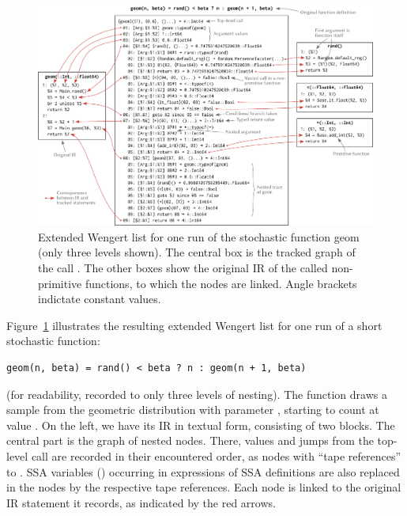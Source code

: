 \begin{figure}[t]
  \centering
  \includegraphics[width=\textwidth]{figures/extended-wengert-list}
  \caption{Extended Wengert list for one run of the stochastic function geom (only three levels
    shown). The central box is the tracked graph of the call \protect{}. The other
    boxes show the original IR of the called non-primitive functions, to which the nodes are
    linked.  Angle brackets indictate constant values.}
  \label{fig:ext-wengert-list}
\end{figure}

Figure~\ref{fig:ext-wengert-list} illustrates the resulting extended Wengert list for one run of a
short stochastic function:
\begin{lstlisting}
geom(n, beta) = rand() < beta ? n : geom(n + 1, beta)
\end{lstlisting}
(for readability, recorded to only three levels of nesting).  The function draws a sample from the
geometric distribution with parameter , starting to count at value . On the
left, we have its IR in textual form, consisting of two blocks. The central part is the graph of
nested nodes.  There, values and jumps from the top-level call are recorded in their encountered
order, as nodes with \enquote{tape references}  to . SSA variables ()
occurring in expressions of SSA definitions are also replaced in the nodes by the respective tape
references.  Each node is linked to the original IR statement it records, as indicated by the red
arrows.

